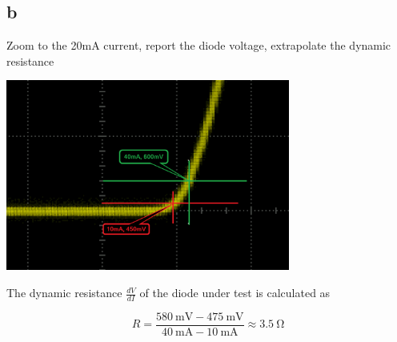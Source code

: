 \documentclass{article}
\begin{document}
	\subsection*{b}
		
	Zoom to the 20mA current, report the diode voltage, extrapolate the dynamic resistance
	
	\begin{center}
	\includegraphics[width=0.7\textwidth]{diode-dynamic-exp}
	\end{center}
	
	The dynamic resistance $\frac{dV}{dI}$ of the diode under test is calculated as
	 
	\[
		R = \frac{\SI{580}{\mV} - \SI{475}{\mV}}{\SI{40}{\mA} - \SI{10}{\mA}} \approx \SI{3.5}{\ohm}
	\]
	
\end{document}
